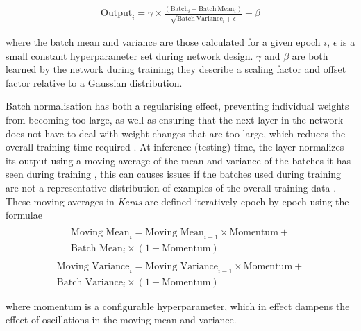 \begin{equation}
    \begin{split}
        \textrm{Output}_i = \gamma \times \frac{(\mathrm{Batch}_i-\mathrm{Batch\  Mean}_i)}{\sqrt{\mathrm{Batch\ Variance}_i+\epsilon}}+\beta
    \end{split}
\label{eq:batchnorm}
\end{equation}

where the batch mean and variance are those calculated for a given epoch $i$, $\epsilon$ is a small constant hyperparameter set during network design. $\gamma$ and $\beta$ are both learned by the network during training; they describe a scaling factor and offset factor relative to a Gaussian distribution. 

Batch normalisation has both a regularising effect, preventing individual weights from becoming too large, as well as ensuring that the next layer in the network does not have to deal with weight changes that are too large, which reduces the overall training time required \cite{tdsbatch}. At inference (testing) time, the layer normalizes its output using a moving average of the mean and variance of the batches it has seen during training \cite{Keras}, this can causes issues if the batches used during training are not a representative distribution of examples of the overall training data \cite{tdsbatch}. These moving averages in \textit{Keras} are defined iteratively epoch by epoch using the formulae
\begin{equation}
    \begin{split}
    \\
    \textrm{Moving Mean}_i=\textrm{Moving Mean}_{i-1}\times \textrm{Momentum} +\\ \textrm{Batch Mean}_i \times (1-\textrm{Momentum})
    \end{split}
    \label{eq:movingav}
\end{equation}
\begin{equation}
    \begin{split}
    \\
    \textrm{Moving Variance}_i=\textrm{Moving Variance}_{i-1}\times \textrm{Momentum} +\\ \textrm{Batch Variance}_i \times (1-\textrm{Momentum})
    \end{split}
    \label{eq:movingstd}
\end{equation}

where momentum is a configurable hyperparameter, which in effect dampens the effect of oscillations in the moving mean and variance.


